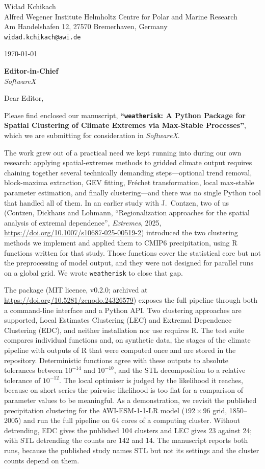 \documentclass[a4paper,12pt]{article}
\begin{document}
\noindent
Widad Kchikach\\
Alfred Wegener Institute Helmholtz Centre for Polar and Marine Research\\
Am Handelshafen 12, 27570 Bremerhaven, Germany\\
\texttt{widad.kchikach@awi.de}

\bigskip
\noindent
\today

\bigskip
\noindent
\textbf{Editor-in-Chief}\\
\textit{SoftwareX}

\bigskip
\noindent
Dear Editor,

\bigskip
Please find enclosed our manuscript,
\textbf{``\texttt{weatherisk}: A Python Package for Spatial Clustering
of Climate Extremes via Max-Stable Processes''}, which we are
submitting for consideration in \textit{SoftwareX}.

\bigskip
The work grew out of a practical need we kept running into during our
own research: applying spatial-extremes methods to gridded climate
output requires chaining together several technically demanding
steps---optional trend removal, block-maxima extraction, GEV fitting,
Fr\'{e}chet transformation, local max-stable parameter estimation,
and finally clustering---and there was no single Python tool that
handled all of them. In an earlier study with J.~Contzen, two of us
(Contzen, Dickhaus and Lohmann, ``Regionalization approaches for the
spatial analysis of extremal dependence'', \textit{Extremes}, 2025,
\url{https://doi.org/10.1007/s10687-025-00519-2}) introduced the two
clustering methods we implement and applied them to CMIP6 precipitation,
using R functions written for that study. Those functions cover the
statistical core but not the preprocessing of model output, and they
were not designed for parallel runs on a global grid. We wrote
\texttt{weatherisk} to close that gap.

\bigskip
The package (MIT licence, v0.2.0; archived at
\url{https://doi.org/10.5281/zenodo.24326579}) exposes the full
pipeline through both a command-line interface and a Python API. Two
clustering approaches are supported, Local Estimates Clustering (LEC)
and Extremal Dependence Clustering (EDC), and neither installation nor
use requires R. The test suite compares individual functions and, on
synthetic data, the stages of the climate pipeline with outputs of R
that were computed once and are stored in the repository.
Deterministic functions agree with these outputs to absolute
tolerances between $10^{-14}$ and $10^{-10}$, and the STL
decomposition to a relative tolerance of $10^{-12}$. The local optimiser is judged by the
likelihood it reaches, because on short series the pairwise likelihood
is too flat for a comparison of parameter values to be meaningful. As
a demonstration, we revisit the published precipitation clustering for
the AWI-ESM-1-1-LR model ($192\times96$ grid, 1850--2005) and run the
full pipeline on 64 cores of a computing cluster. Without detrending,
EDC gives the published 104 clusters and LEC gives 23 against 24; with
STL detrending the counts are 142 and 14. The manuscript reports both
runs, because the published study names STL but not its
settings and the cluster counts depend on them.
\end{document}

